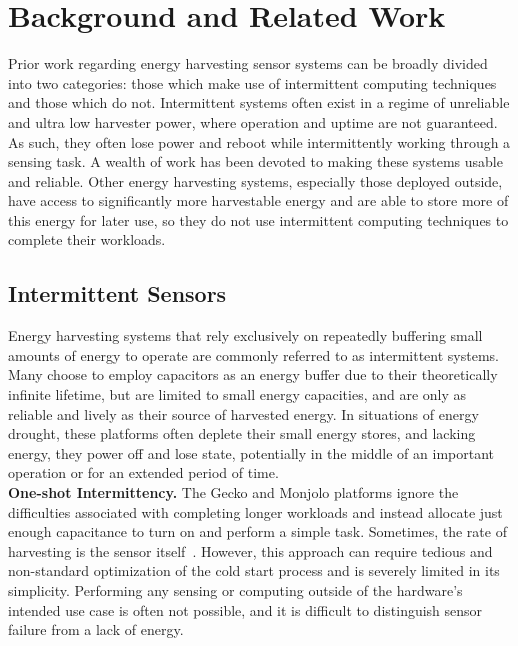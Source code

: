 \section{Background and Related Work}
\label{sec:related}

Prior work regarding energy harvesting sensor systems can be broadly
divided into two categories: those which make use of intermittent computing
techniques and those which do not.
Intermittent systems often exist in a regime of unreliable and ultra low harvester power, where
operation and uptime are not guaranteed. As such, they often lose power and
reboot while intermittently working through a sensing task.
A wealth of work has been devoted to
making these systems usable and reliable.
Other energy harvesting systems, especially those deployed outside, have access
to significantly more harvestable energy and are able to store more of this energy
for later use, so they
do not use intermittent computing techniques to complete their workloads.
\subsection{Intermittent Sensors}
\label{sec:related:intermittent}

Energy harvesting systems that rely
exclusively on repeatedly buffering small amounts of energy to
operate are commonly referred to as intermittent systems.
Many choose to employ
capacitors as an energy buffer due to their theoretically infinite lifetime,
but are limited to small energy capacities, and are only as reliable and
lively as their source of harvested energy.
In situations of energy drought, 
these platforms often deplete their 
small energy stores, and lacking energy,
they power off and lose
state, potentially in the middle of an important operation or for an extended
period of time.
\\

\vspace{-6pt}
\noindent
\textbf{One-shot Intermittency.}
The Gecko and Monjolo platforms ignore the difficulties associated with
completing longer workloads and instead allocate
just enough capacitance to turn on and perform a simple task. Sometimes, the
rate of harvesting is the sensor itself~\cite{campbellEnergy14,
yervaGrafting12, debruin2013monjolo}.  However, this approach can require
tedious and non-standard optimization of the cold start process and is severely
limited in its simplicity. Performing any sensing or computing outside of the
hardware's intended use case is often not possible,
and it is difficult to distinguish sensor failure from a lack of energy.
\\

